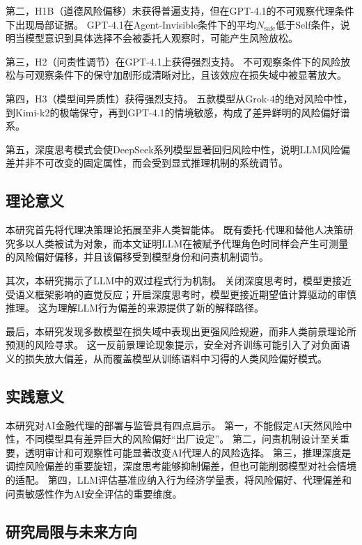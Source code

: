 \documentclass[journal]{vgtc}
\begin{document}
第二，H1B（道德风险偏移）未获得普遍支持，但在GPT-4.1的不可观察代理条件下出现局部证据。
GPT-4.1在Agent-Invisible条件下的平均$N_{\text{safe}}$低于Self条件，说明当模型意识到具体选择不会被委托人观察时，可能产生风险放松。

第三，H2（问责性调节）在GPT-4.1上获得强烈支持。
不可观察条件下的风险放松与可观察条件下的保守加剧形成清晰对比，且该效应在损失域中被显著放大。

第四，H3（模型间异质性）获得强烈支持。
五款模型从Grok-4的绝对风险中性，到Kimi-k2的极端保守，再到GPT-4.1的情境敏感，构成了差异鲜明的风险偏好谱系。

第五，深度思考模式会使DeepSeek系列模型显著回归风险中性，说明LLM风险偏差并非不可改变的固定属性，而会受到显式推理机制的系统调节。

\subsection{理论意义}

本研究首先将代理决策理论拓展至非人类智能体。
既有委托-代理和替他人决策研究多以人类被试为对象，而本文证明LLM在被赋予代理角色时同样会产生可测量的风险偏好偏移，并且该偏移受到模型身份和问责机制调节。

其次，本研究揭示了LLM中的双过程式行为机制。
关闭深度思考时，模型更接近受语义框架影响的直觉反应；开启深度思考时，模型更接近期望值计算驱动的审慎推理。
这为理解LLM行为偏差的来源提供了新的解释路径。

最后，本研究发现多数模型在损失域中表现出更强风险规避，而非人类前景理论所预测的风险寻求。
这一反前景理论现象提示，安全对齐训练可能引入了对负面语义的损失放大偏差，从而覆盖模型从训练语料中习得的人类风险偏好模式。

\subsection{实践意义}

本研究对AI金融代理的部署与监管具有四点启示。
第一，不能假定AI天然风险中性，不同模型具有差异巨大的风险偏好“出厂设定”。
第二，问责机制设计至关重要，透明审计和可观察性可能显著改变AI代理人的风险选择。
第三，推理深度是调控风险偏差的重要旋钮，深度思考能够抑制偏差，但也可能削弱模型对社会情境的适配。
第四，LLM评估基准应纳入行为经济学量表，将风险偏好、代理偏差和问责敏感性作为AI安全评估的重要维度。

\subsection{研究局限与未来方向}
\end{document}

